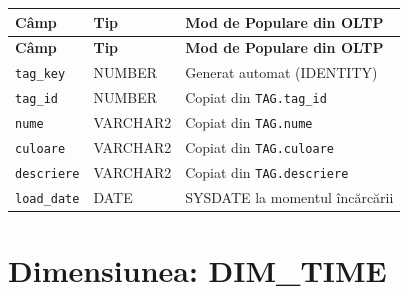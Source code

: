 \begin{longtable}{|>{\raggedright\arraybackslash}p{3.5cm}|>{\raggedright\arraybackslash}p{2.8cm}|>{\raggedright\arraybackslash}p{8.7cm}|}
\hline
\textbf{Câmp} & \textbf{Tip} & \textbf{Mod de Populare din OLTP} \\
\hline
\endfirsthead
\hline
\textbf{Câmp} & \textbf{Tip} & \textbf{Mod de Populare din OLTP} \\
\hline
\endhead
\hline
\endfoot
\hline
\endlastfoot

\texttt{tag\_key} & NUMBER & Generat automat (IDENTITY) \\
\hline
\texttt{tag\_id} & NUMBER & Copiat din \texttt{TAG.tag\_id} \\
\hline
\texttt{nume} & VARCHAR2 & Copiat din \texttt{TAG.nume} \\
\hline
\texttt{culoare} & VARCHAR2 & Copiat din \texttt{TAG.culoare} \\
\hline
\texttt{descriere} & VARCHAR2 & Copiat din \texttt{TAG.descriere} \\
\hline
\texttt{load\_date} & DATE & SYSDATE la momentul încărcării \\
\hline
\end{longtable}

\section{Dimensiunea: DIM\_TIME}

